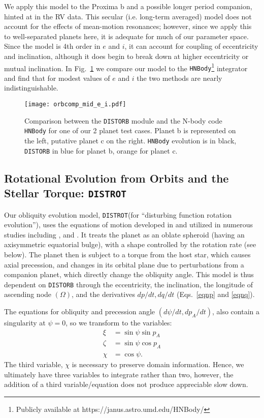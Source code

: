 \documentclass[preprint,12pt]{aastex}
\newcommand{\xxx}[1]{{\color{red} #1}} %
\def\distorb{\texttt{\footnotesize{DISTORB}}\xspace}
\def\distrot{\texttt{\footnotesize{DISTROT}}\xspace}
\begin{document}
We apply this model to the Proxima b and a possible longer period
companion, hinted at in the RV data. This secular (i.e. long-term
averaged) model does not account for the effects of mean-motion
resonances; however, since we apply this to well-separated planets
here, it is adequate for much of our parameter space. Since the model
is 4th order in $e$ and $i$, it can account for coupling of
eccentricity and inclination, although it does begin to break down at
higher eccentricity or mutual inclination. In
Fig.~\ref{fig:orbitvalid} we compare our model to the
{\footnotesize \texttt{HNBody}}\footnote{\xxx{Publicly available at
 https://janus.astro.umd.edu/HNBody/}}
integrator \citep{RauchHamilton02} and find that for modest values of
$e$ and $i$ the two methods are nearly indistinguishable.
 
\begin{figure}
\texttt{[image: orbcomp\_mid\_e\_i.pdf]}
\caption{Comparison between the \distorb module and the N-body code 
   {\footnotesize \texttt{HNBody}} for one of our 2
   planet test cases. Planet b is represented on the left, putative
   planet c on the right. {\footnotesize \texttt{HNBody}} evolution is in 
   black, \distorb in blue for planet b, orange for planet c.}
\label{fig:orbitvalid}
\end{figure} 

\subsection{Rotational Evolution from Orbits and the Stellar Torque: \distrot}
\label{sec:models:distrot}
Our obliquity evolution model, \distrot (for ``disturbing function rotation
evolution''), uses the equations of motion developed in
\cite{Kinoshita1975, Kinoshita1977} and utilized in numerous studies 
including  \cite{Laskar1986,Laskar1993a,Laskar1993b}, and \cite{Armstrong14}.  
It treats the planet as an oblate spheroid (having an axisymmetric equatorial
bulge), with a shape controlled by the rotation rate (see below). The planet then is
subject to a torque from the host star, which causes axial precession,
and changes in its orbital plane due to perturbations from a companion
planet, which directly change the obliquity angle.  This model is thus
dependent on \distorb through the eccentricity, the inclination, the 
longitude of ascending node $(\Omega)$, and the derivatives $dp/dt,
dq/dt$ (Eqs.~\ref{eqnp} and \ref{eqnq}).

The equations for obliquity and precession angle $(d\psi/dt,
dp_A/dt)$, also contain a singularity at $\psi = 0$, so we transform
to the variables:
\begin{align}
\xi & = \sin{\psi} \sin{p_A} \\
\zeta & = \sin{\psi} \cos{p_A} \\
\chi & = \cos{\psi}.
\end{align}
The third variable, $\chi$ is necessary to preserve domain information. Hence,
we ultimately have three variables to integrate rather than two, however, the
addition of a third variable/equation does not produce appreciable slow down.
\end{document}
